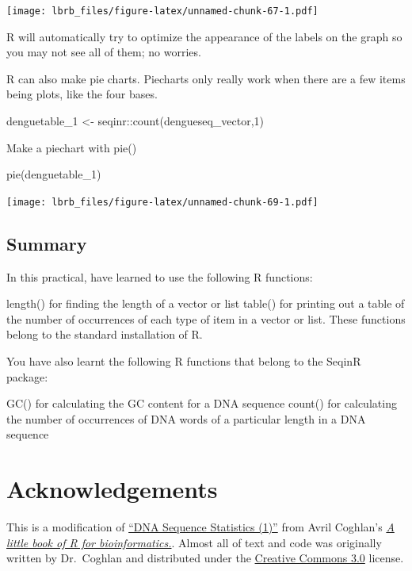 \documentclass[
]{book}
\newenvironment{Shaded}{\begin{snugshade}}{\end{snugshade}}
\newcommand{\DecValTok}[1]{\textcolor[rgb]{0.00,0.00,0.81}{#1}}
\newcommand{\FunctionTok}[1]{\textcolor[rgb]{0.00,0.00,0.00}{#1}}
\newcommand{\NormalTok}[1]{#1}
\newcommand{\OtherTok}[1]{\textcolor[rgb]{0.56,0.35,0.01}{#1}}
\newcommand{\SpecialCharTok}[1]{\textcolor[rgb]{0.00,0.00,0.00}{#1}}
\begin{document}
\texttt{[image: lbrb\_files/figure-latex/unnamed-chunk-67-1.pdf]}

R will automatically try to optimize the appearance of the labels on the graph so you may not see all of them; no worries.

R can also make pie charts. Piecharts only really work when there are a few items being plots, like the four bases.

\begin{Shaded}
\begin{Highlighting}[]
\NormalTok{denguetable\_1 }\OtherTok{\textless{}{-}}\NormalTok{ seqinr}\SpecialCharTok{::}\FunctionTok{count}\NormalTok{(dengueseq\_vector,}\DecValTok{1}\NormalTok{)}
\end{Highlighting}
\end{Shaded}

Make a piechart with pie()

\begin{Shaded}
\begin{Highlighting}[]
\FunctionTok{pie}\NormalTok{(denguetable\_1)}
\end{Highlighting}
\end{Shaded}

\texttt{[image: lbrb\_files/figure-latex/unnamed-chunk-69-1.pdf]}

\hypertarget{summary}{%
\subsection{Summary}\label{summary}}

In this practical, have learned to use the following R functions:

length() for finding the length of a vector or list
table() for printing out a table of the number of occurrences of each type of item in a vector or list.
These functions belong to the standard installation of R.

You have also learnt the following R functions that belong to the SeqinR package:

GC() for calculating the GC content for a DNA sequence
count() for calculating the number of occurrences of DNA words of a particular length in a DNA sequence

\hypertarget{acknowledgements}{%
\section{Acknowledgements}\label{acknowledgements}}

This is a modification of \href{https://a-little-book-of-r-for-bioinformatics.readthedocs.io/en/latest/src/chapter1.html}{``DNA Sequence Statistics (1)''} from Avril Coghlan's \href{https://a-little-book-of-r-for-bioinformatics.readthedocs.io/en/latest/index.html}{\emph{A little book of R for bioinformatics.}}. Almost all of text and code was originally written by Dr.~Coghlan and distributed under the \href{https://creativecommons.org/licenses/by/3.0/us/}{Creative Commons 3.0} license.
\end{document}

